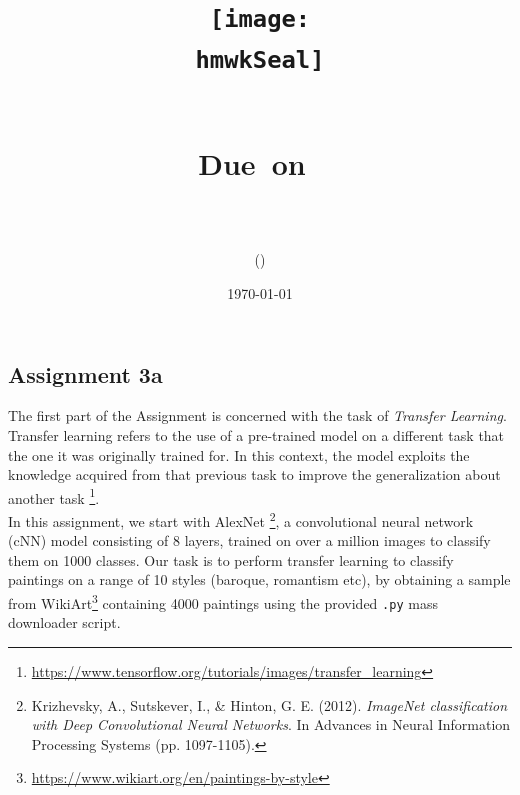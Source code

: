 \documentclass{article}
\title{
	\centering
	\texttt{[image: \\hmwkSeal]}
	
	\vspace{1in}
	\textmd{\textbf{\hmwkClass\ \hmwkTitle}}\\
	
	\normalsize\vspace{0.1in}\small{Due\ on\ \hmwkDueDate}\\
	
	\vspace{0.1in}
	\large{\textit{\hmwkClassInstructor}} \\
	\vspace{0.5in}
	
	\large{\hmwkUniversity}
	
	\vspace{3in}
	
	\author{\textbf{\hmwkAuthorName} (\hmwkAuthorID)}
	\date{\today}
}
\def\code#1{\texttt{#1}}
\begin{document}
	
	\maketitle
	
	\pagebreak
	
	\subsection{Assignment 3a}
	
	The first part of the Assignment is concerned with the task of \textit{Transfer Learning}. Transfer learning refers to the use of a pre-trained model on a different task that the one it was originally trained for. In this context, the model exploits the knowledge acquired from that previous task to improve the generalization about another task \footnote{\url{https://www.tensorflow.org/tutorials/images/transfer_learning}}. \\
	
	In this assignment, we start with AlexNet \footnote{Krizhevsky, A., Sutskever, I., \& Hinton, G. E. (2012). \textit{ImageNet classification with Deep Convolutional Neural Networks}. In Advances in Neural Information Processing Systems (pp. 1097-1105).}, a convolutional neural network (cNN) model consisting of 8 layers, trained on over a million images to classify them on 1000 classes. Our task is to perform transfer learning to classify paintings on a range of 10 styles (baroque, romantism etc), by obtaining a sample from WikiArt\footnote{\url{https://www.wikiart.org/en/paintings-by-style}} containing 4000 paintings using the provided \code{.py} mass downloader script. \\
	
\end{document}
